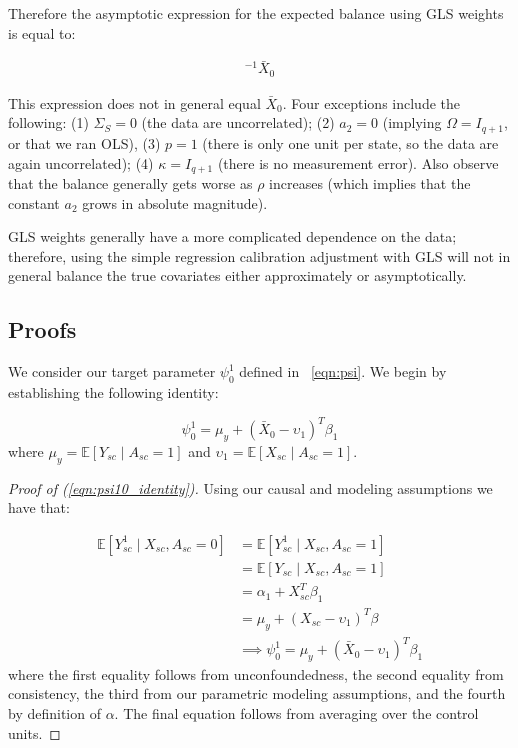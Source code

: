 \begin{remark}
    Therefore the asymptotic expression for the expected balance using GLS weights is equal to:
    
    \begin{align*}
    [a_1\Sigma_X\kappa + a_2(p-1)\Sigma_S\kappa][a_1\Sigma_X\kappa + a_2(p-1)\kappa^T\Sigma_S\kappa]^{-1}\bar{X}_0 
    \end{align*}

    This expression does not in general equal $\bar{X}_0$. Four exceptions include the following: (1) $\Sigma_S = 0$ (the data are uncorrelated); (2) $a_2 = 0$ (implying $\Omega = I_{q+1}$, or that we ran OLS), (3) $p = 1$ (there is only one unit per state, so the data are again uncorrelated); (4) $\kappa = I_{q+1}$ (there is no measurement error). Also observe that the balance generally gets worse as $\rho$ increases (which implies that the constant $a_2$ grows in absolute magnitude).
    
    GLS weights generally have a more complicated dependence on the data; therefore, using the simple regression calibration adjustment with GLS will not in general balance the true covariates either approximately or asymptotically.
\end{remark}


\subsection{Proofs}


We consider our target parameter $\psi_0^1$ defined in ~\eqref{eqn:psi}. We begin by establishing the following identity:

\begin{equation}\label{eqn:psi10_identity}
\psi^1_0 = \mu_y + (\bar{X}_0 - \upsilon_1)^T\beta_1
\end{equation}
%
where $\mu_y = \mathbb{E}[Y_{sc} \mid A_{sc} = 1]$ and $\upsilon_1 = \mathbb{E}[X_{sc} \mid A_{sc} = 1]$.

\begin{proof}[Proof of (\ref{eqn:psi10_identity})]
Using our causal and modeling assumptions we have that:

\begin{align*}
\mathbb{E}[Y_{sc}^1 \mid X_{sc}, A_{sc} = 0] &= \mathbb{E}[Y_{sc}^1 \mid X_{sc}, A_{sc} = 1] \\
&= \mathbb{E}[Y_{sc} \mid X_{sc}, A_{sc} = 1] \\
&= \alpha_1 + X_{sc}^T\beta_1 \\
&= \mu_y + (X_{sc} - \upsilon_1)^T\beta \\
&\implies \psi_0^1 = \mu_y + (\bar{X}_0 - \upsilon_1)^T\beta_1
\end{align*}
%
where the first equality follows from unconfoundedness, the second equality from consistency, the third from our parametric modeling assumptions, and the fourth by definition of $\alpha$. The final equation follows from averaging over the control units.
\end{proof}
%

